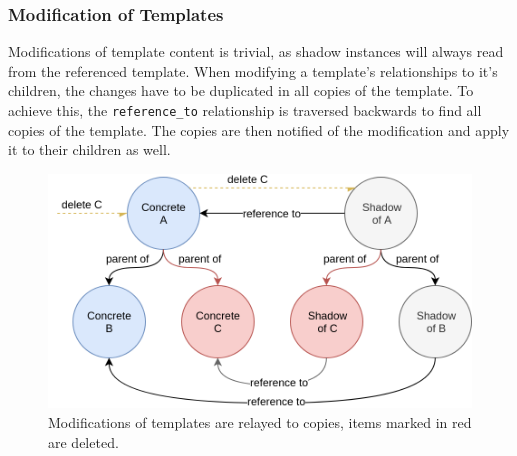 \documentclass[a4paper,11pt]{article}
\def\inline{\lstinline[basicstyle=\ttfamily,keywordstyle={}]}
\begin{document}
                \subsubsection{Modification of Templates}
                    Modifications of template content is trivial, as shadow instances
                    will always read from the referenced template.
                    When modifying a template's relationships to it's children,
                    the changes have to be duplicated in all copies of the template.
                    To achieve this, the \inline{reference_to} relationship is
                    traversed backwards to find all copies of the template. The
                    copies are then notified of the modification and apply
                    it to their children as well.

                    \begin{figure}
                        \centering
                        \includegraphics[width=.68\textwidth]{modify-template-structure-delete}
                        \caption{Modifications of templates are relayed to copies, items marked in red are deleted.}
                        \label{fig:shadow-concept}
                    \end{figure}
\end{document}
